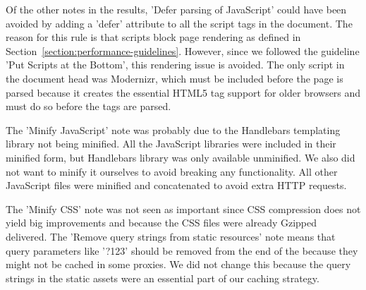 Of the other notes in the results, 'Defer parsing of JavaScript' could
have been avoided by adding a 'defer' attribute to all the script tags
in the document. The reason for this rule is that scripts block page
rendering as defined in
Section~\ref{section:performance-guidelines}. However, since we
followed the guideline 'Put Scripts at the Bottom', this rendering
issue is avoided. The only script in the document head was Modernizr,
which must be included before the page is parsed because it creates
the essential HTML5 tag support for older browsers and must do so
before the tags are parsed.

The 'Minify JavaScript' note was probably due to the Handlebars
templating library not being minified. All the JavaScript libraries
were included in their minified form, but Handlebars library was only
available unminified. We also did not want to minify it ourselves to
avoid breaking any functionality. All other JavaScript files were
minified and concatenated to avoid extra HTTP requests.

The 'Minify CSS' note was not seen as important since CSS compression
does not yield big improvements and because the CSS files were already
Gzipped delivered. The 'Remove query strings from static resources'
note means that query parameters like '?123' should be removed from
the end of the  because they might not be cached in some
proxies. We did not change this because the query strings in the
static assets were an essential part of our caching strategy.
